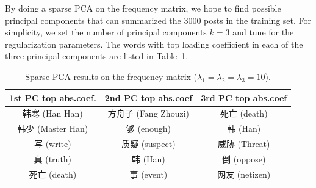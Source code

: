 \documentclass[11pt]{article}
\newcommand{\1}[1]{{\mathbf 1}\left\{#1\right\}}        %
\begin{document}


By doing a sparse PCA on the frequency matrix, we hope to find possible principal components that can summarized the 3000 posts in the training set. For simplicity, we set the number of principal components $k=3$ and tune for the regularization parameters. The words with top loading coefficient in each of the three principal components are listed in Table~\ref{tb:spca}.

\begin{table}[htb]
\caption{Sparse PCA results on the frequency matrix ($\lambda_1=\lambda_2=\lambda_3 = 10$).}
\begin{center}
\begin{tabular}{|c|c|c|}
\hline
1st PC top abs.coef.  &  2nd PC top abs.coef   & 3rd PC top abs.coef \\ \hline
     韩寒 (Han Han)      &       方舟子 (Fang Zhouzi)    &   死亡 (death)\\ \hline
     韩少 (Master Han)   &        够 (enough)        &        韩 (Han)\\ \hline
     写 (write)         &       质疑 (suspect)        &     威胁 (Threat)\\ \hline
     真 (truth)         &         韩 (Han)         &         倒 (oppose)\\ \hline
     死亡 (death)         &       事 (event)      &         网友 (netizen)\\ \hline
\end{tabular}
\end{center}
\label{tb:spca}
\end{table}%
\end{document}
